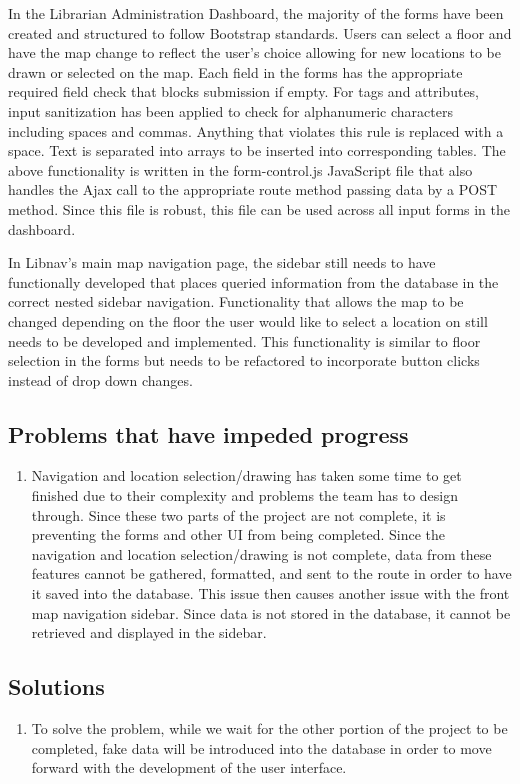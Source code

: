 \documentclass[letterpaper,10pt,titlepage, onecolumn, compsoc]{IEEEtran}
\begin{document}
In the Librarian Administration Dashboard, the majority of the forms have been created and structured to follow Bootstrap standards. Users can select a floor and have the map change to reflect the user’s choice allowing for new locations to be drawn or selected on the map. Each field in the forms has the appropriate required field check that blocks submission if empty. For tags and attributes, input sanitization has been applied to check for alphanumeric characters including spaces and commas. Anything that violates this rule is replaced with a space. Text is separated into arrays to be inserted into corresponding tables. The above functionality is written in the form-control.js JavaScript file that also handles the Ajax call to the appropriate route method passing data by a POST method. Since this file is robust, this file can be used across all input forms in the dashboard. 

In Libnav’s main map navigation page, the sidebar still needs to have functionally developed that places queried information from the database in the correct nested sidebar navigation. Functionality that allows the map to be changed depending on the floor the user would like to select a location on still needs to be developed and implemented. This functionality is similar to floor selection in the forms but needs to be refactored to incorporate button clicks instead of drop down changes.  

\subsection{Problems that have impeded progress}
\begin{enumerate}
	\item Navigation and location selection/drawing has taken some time to get finished due to their complexity and problems the team has to design through. Since these two parts of the project are not complete, it is preventing the forms and other UI from being completed. Since the navigation and location selection/drawing is not complete, data from these features cannot be gathered, formatted, and sent to the route in order to have it saved into the database. This issue then causes another issue with the front map navigation sidebar. Since data is not stored in the database, it cannot be retrieved and displayed in the sidebar.  
\end{enumerate}

\subsection{Solutions}
\begin{enumerate}
	\item To solve the problem, while we wait for the other portion of the project to be completed, fake data will be introduced into the database in order to move forward with the development of the user interface. 
\end{enumerate}
\end{document}
